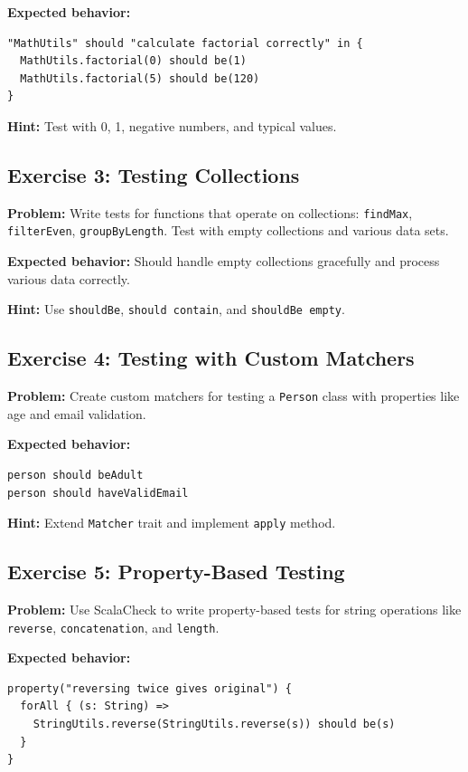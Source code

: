 \documentclass[12pt,a4paper]{article}
\begin{document}
\textbf{Expected behavior:}
\begin{lstlisting}
"MathUtils" should "calculate factorial correctly" in {
  MathUtils.factorial(0) should be(1)
  MathUtils.factorial(5) should be(120)
}
\end{lstlisting}

\textbf{Hint:} Test with 0, 1, negative numbers, and typical values.

\subsection{Exercise 3: Testing Collections}
\textbf{Problem:} Write tests for functions that operate on collections: \texttt{findMax}, \texttt{filterEven}, \texttt{groupByLength}. Test with empty collections and various data sets.

\textbf{Expected behavior:} Should handle empty collections gracefully and process various data correctly.

\textbf{Hint:} Use \texttt{shouldBe}, \texttt{should contain}, and \texttt{shouldBe empty}.

\subsection{Exercise 4: Testing with Custom Matchers}
\textbf{Problem:} Create custom matchers for testing a \texttt{Person} class with properties like age and email validation.

\textbf{Expected behavior:}
\begin{lstlisting}
person should beAdult
person should haveValidEmail
\end{lstlisting}

\textbf{Hint:} Extend \texttt{Matcher} trait and implement \texttt{apply} method.

\subsection{Exercise 5: Property-Based Testing}
\textbf{Problem:} Use ScalaCheck to write property-based tests for string operations like \texttt{reverse}, \texttt{concatenation}, and \texttt{length}.

\textbf{Expected behavior:}
\begin{lstlisting}
property("reversing twice gives original") {
  forAll { (s: String) =>
    StringUtils.reverse(StringUtils.reverse(s)) should be(s)
  }
}
\end{lstlisting}
\end{document}
